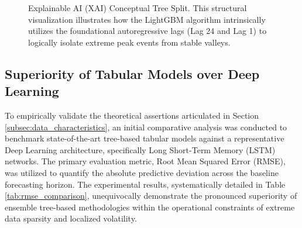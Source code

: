 \documentclass[pdflatex,sn-mathphys-num]{sn-jnl}%
\theoremstyle{thmstyleone}%
\theoremstyle{thmstyletwo}%
\theoremstyle{thmstylethree}%
\begin{document}
\begin{figure}[htbp]
\centering
{}
\caption{Explainable AI (XAI) Conceptual Tree Split. This structural visualization illustrates how the LightGBM algorithm intrinsically utilizes the foundational autoregressive lags (Lag 24 and Lag 1) to logically isolate extreme peak events from stable valleys.}\label{fig:xai_tree}
\end{figure}



\subsection{Superiority of Tabular Models over Deep Learning}\label{subsec3_1}
To empirically validate the theoretical assertions articulated in Section \ref{subsec:data_characteristics}, an initial comparative analysis was conducted to benchmark state-of-the-art tree-based tabular models against a representative Deep Learning architecture, specifically Long Short-Term Memory (LSTM) networks. The primary evaluation metric, Root Mean Squared Error (RMSE), was utilized to quantify the absolute predictive deviation across the baseline forecasting horizon. The experimental results, systematically detailed in Table \ref{tab:rmse_comparison}, unequivocally demonstrate the pronounced superiority of ensemble tree-based methodologies within the operational constraints of extreme data sparsity and localized volatility.
\end{document}
